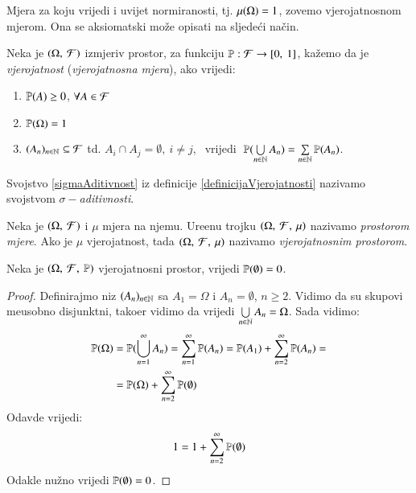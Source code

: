 Mjera za koju vrijedi i uvijet normiranosti, tj. $\mu({\Omega}) = 1$, zovemo
vjerojatnosnom mjerom. Ona se aksiomatski mo\v ze opisati na sljede\' ci na\v cin.

\begin{defn} \label{definicijaVjerojatnosti}
    Neka je $(\Omega, \: \mathcal{F})$ izmjeriv prostor, za funkciju
    $ \mathbb{P} : \mathcal{F} \to [ 0, \: 1 ]$, ka\v zemo da je \emph{vjerojatnost}
    (\emph{vjerojatnosna mjera}), ako vrijedi:
    \begin{enumerate}[label={(\arabic*)}]
        \item $\mathbb{P}({A}) \geq 0$, $\forall A \in \mathcal{F} $
        \item $\mathbb{P}({\Omega}) = 1$
        \item $(A_n)_{n \in \mathbb{N}} \subseteq \mathcal{F} $ td. $A_i \cap A_j = \emptyset, \:
            i \neq j, \;$ vrijedi $\; \mathbb{P}({\bigcup\limits_{n \in \mathbb{N}}^{} A_n}) =
            \sum\limits_{n \in \mathbb{N}}^{} \mathbb{P}({A_n})$. \label{sigmaAditivnost}
    \end{enumerate}
\end{defn}

\begin{nap}
    Svojstvo \eqref{sigmaAditivnost} iz definicije \ref{definicijaVjerojatnosti}
    nazivamo svojstvom \emph{$\sigma-$aditivnosti}.
\end{nap}

\begin{defn}
    Neka je $(\Omega, \: \mathcal{F})$ i $\mu$ mjera na njemu. Ure\dj enu trojku
    $(\Omega, \: \mathcal{F}, \: \mu)$ nazivamo \emph{prostorom mjere}. Ako je $\mu$
    vjerojatnost, tada $(\Omega, \: \mathcal{F}, \: \mu)$ nazivamo
    \emph{vjerojatnosnim prostorom}.
\end{defn}

\begin{prop}
    Neka je $(\Omega, \: \mathcal{F}, \: \mathbb{P})$ vjerojatnosni prostor, vrijedi
    $\mathbb{P}({\emptyset}) = 0$.
\end{prop}

\begin{proof}
    Definirajmo niz $(A_n)_{n \in \mathbb{N}}$ sa $A_1 = \Omega$ i $A_n = \emptyset$,
    $n \geq 2$. Vidimo da su skupovi me\dj usobno disjunktni, tako\dj er vidimo
    da vrijedi $\bigcup\limits_{n \in \mathbb{N}}^{} A_n = \Omega$. Sada vidimo:
    \begin{align*}
        \mathbb{P}({\Omega}) &= \mathbb{P}({\bigcup\limits_{n=1}^{\infty} A_n}) = \sum\limits_{n=1}^{\infty}
            \mathbb{P}({A_n}) = \mathbb{P}({A_1}) + \sum\limits_{n=2}^{\infty} \mathbb{P}({A_n}) = \\
            &= \mathbb{P}({\Omega}) + \sum\limits_{n=2}^{\infty} \mathbb{P}({\emptyset})
    \end{align*}
    Odavde vrijedi:
    \begin{equation*}
        1 = 1 + \sum\limits_{n = 2}^{\infty} \mathbb{P}({\emptyset})
    \end{equation*}
    Odakle nu\v zno vrijedi $\mathbb{P}({\emptyset}) = 0$.

\end{proof}


